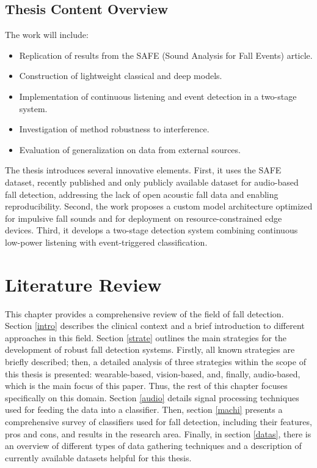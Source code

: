 \documentclass[11pt, a4paper, twoside]{article}
\begin{document}
\subsection{Thesis Content Overview}
The work will include:

\begin{itemize}
\item Replication of results from the SAFE (Sound Analysis for Fall Events) article.
\item Construction of lightweight classical and deep models.
\item Implementation of continuous listening and event detection in a two-stage system.
\item Investigation of method robustness to interference.
\item Evaluation of generalization on data from external sources. 
\end{itemize}

The thesis introduces several innovative elements. First, it uses the SAFE dataset, recently published and only publicly available dataset for audio-based fall detection, addressing the lack of open acoustic fall data and enabling reproducibility. Second, the work proposes a custom model architecture optimized for impulsive fall sounds and for deployment on resource-constrained edge devices. Third, it develops a two-stage detection system combining continuous low-power listening with event-triggered classification.


\section{Literature Review}
This chapter provides a comprehensive review of the field of fall detection. Section \ref{intro} describes the clinical context and a brief introduction to different approaches in this field. Section \ref{strate} outlines the main strategies for the development of robust fall detection systems. Firstly, all known strategies are briefly described; then, a detailed analysis of three strategies within the scope of this thesis is presented: wearable-based, vision-based, and, finally, audio-based, which is the main focus of this paper. Thus, the rest of this chapter focuses specifically on this domain. Section \ref{audio} details signal processing techniques used for feeding the data into a classifier. Then, section \ref{machi} presents a comprehensive survey of classifiers used for fall detection, including their features, pros and cons, and results in the research area. Finally, in section \ref{datas}, there is an overview of different types of data gathering techniques and a description of currently available datasets helpful for this thesis.
\end{document}
